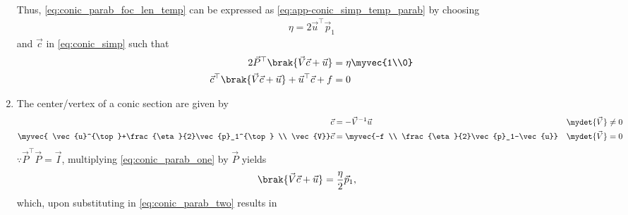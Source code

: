\begin{enumerate}[label=\thesubsection.\arabic*.,ref=\thesubsection.\theenumi]
\begin{multline}
\label{eq:conic_parab_foc_len_temp} 
\end{multline}
Thus, \eqref{eq:conic_parab_foc_len_temp} 
can be expressed as \eqref{eq:app-conic_simp_temp_parab} by choosing
\begin{align}
\eta = 2\vec{u}^{\top}\vec{p}_1
\end{align}
and $\vec{c}$ in \eqref{eq:conic_simp} such that
\begin{align}
\label{eq:conic_parab_one}
2\vec{P}^{\top}\brak{\vec{V}\vec{c}+\vec{u}} &= \eta\myvec{1\\0}
\\
\vec{c}^{\top}\brak{\vec{V}\vec{c} + \vec{u}}+ \vec{u}^{\top}\vec{c} + f&= 0
\label{eq:conic_parab_two}
\end{align}
	\item
		The center/vertex of a conic section are given by
  \begin{align}
    \label{eq:app-conic_nonparab_c}
	    \vec{c} &= - \vec{V}^{-1}\vec{u}  & \mydet{\vec{V}} \ne 0
    \\
	    \myvec{ \vec{u}^{\top}+\frac{\eta}{2}\vec{p}_1^{\top} \\ \vec{V}}\vec{c} &= \myvec{-f \\ \frac{\eta}{2}\vec{p}_1-\vec{u}}  
& \mydet{\vec{V}} = 0
    \label{eq:conic_parab_c}
    \end{align}	
\solution	
$\because
\vec{P}^{\top}\vec{P} = \vec{I}$,
multiplying \eqref{eq:conic_parab_one} by $\vec{P}$ yields
\begin{align}
\label{eq:conic_parab_one_eig}
	\brak{\vec{V}\vec{c}+\vec{u}} &= \frac{\eta}{2}\vec{p}_1,
\end{align}
which, upon substituting in \eqref{eq:conic_parab_two}
results in 
\begin{align}

\end{align}
\end{enumerate}
